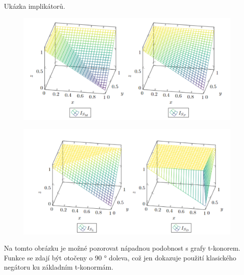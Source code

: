 \begin{graph} Uk\' azka implik\' ator\r u.
    \begin{figure}[H]
                \hspace{-1cm}
                \includegraphics[scale=0.65]{template-fig/impl1.pdf}
                \centering
            \end{figure}
            \begin{figure}[H]
                \hspace{-1cm}
                \includegraphics[scale=0.65]{template-fig/impl2.pdf}
                \centering
            \end{figure}

\end{graph}
Na tomto obrázku je možné pozorovat nápadnou podobnost s grafy t-konorem. Funkce se zdají být otočeny o 90 ° doleva, což jen dokazuje použití klasick\' eho negátoru ku základním t-konormám. 



